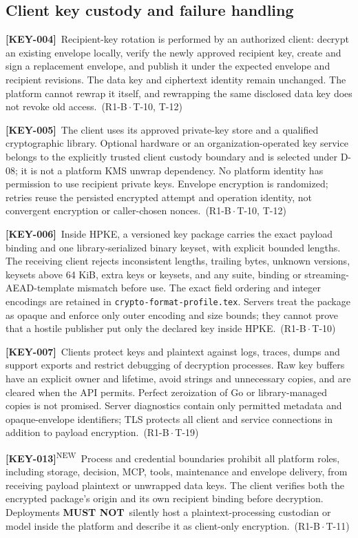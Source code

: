 \documentclass[11pt,a4paper]{article}
\newcommand{\mustnot}{\textbf{MUST NOT}}
\newcommand{\code}[1]{{\small\nolinkurl{#1}}}
\newcommand{\reqtag}[2]{{\footnotesize\color{accent}(#1\,$\cdot$\,#2)}}
\newcommand{\req}[4]{\par\noindent\hypertarget{req:#1}{\textbf{[#1]}}\ #4\ \reqtag{#2}{#3}\par}
\newcommand{\reqn}[4]{\par\noindent\hypertarget{req:#1}{\textbf{[#1]}}\textsuperscript{\color{accent}\tiny NEW}\ #4\ \reqtag{#2}{#3}\par}
\begin{document}
\subsection{Client key custody and failure handling}
\req{KEY-004}{R1-B}{T-10, T-12}{Recipient-key rotation is performed by an authorized client: decrypt an existing envelope locally, verify the newly approved recipient key, create and sign a replacement envelope, and publish it under the expected envelope and recipient revisions. The data key and ciphertext identity remain unchanged. The platform cannot rewrap it itself, and rewrapping the same disclosed data key does not revoke old access.}
\req{KEY-005}{R1-B}{T-10, T-12}{The client uses its approved private-key store and a qualified cryptographic library. Optional hardware or an organization-operated key service belongs to the explicitly trusted client custody boundary and is selected under D-08; it is not a platform KMS unwrap dependency. No platform identity has permission to use recipient private keys. Envelope encryption is randomized; retries reuse the persisted encrypted attempt and operation identity, not convergent encryption or caller-chosen nonces.}
\req{KEY-006}{R1-B}{T-10}{Inside HPKE, a versioned key package carries the exact payload binding and one library-serialized binary keyset, with explicit bounded lengths. The receiving client rejects inconsistent lengths, trailing bytes, unknown versions, keysets above 64 KiB, extra keys or keysets, and any suite, binding or streaming-AEAD-template mismatch before use. The exact field ordering and integer encodings are retained in \code{crypto-format-profile.tex}. Servers treat the package as opaque and enforce only outer encoding and size bounds; they cannot prove that a hostile publisher put only the declared key inside HPKE.}
\req{KEY-007}{R1-B}{T-19}{Clients protect keys and plaintext against logs, traces, dumps and support exports and restrict debugging of decryption processes. Raw key buffers have an explicit owner and lifetime, avoid strings and unnecessary copies, and are cleared when the API permits. Perfect zeroization of Go or library-managed copies is not promised. Server diagnostics contain only permitted metadata and opaque-envelope identifiers; TLS protects all client and service connections in addition to payload encryption.}
\reqn{KEY-013}{R1-B}{T-11}{Process and credential boundaries prohibit all platform roles, including storage, decision, MCP, tools, maintenance and envelope delivery, from receiving payload plaintext or unwrapped data keys. The client verifies both the encrypted package's origin and its own recipient binding before decryption. Deployments \mustnot\ silently host a plaintext-processing custodian or model inside the platform and describe it as client-only encryption.}
\end{document}
